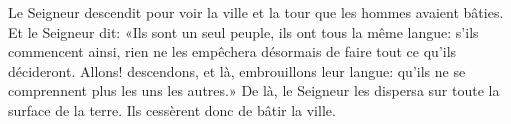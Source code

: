 Le Seigneur descendit pour voir la ville et la tour que les hommes avaient bâties.
Et le Seigneur dit: «Ils sont un seul peuple, ils ont tous la même langue:
	s’ils commencent ainsi, rien ne les empêchera désormais
	de faire tout ce qu’ils décideront.
Allons! descendons, et là, embrouillons leur langue:
	qu’ils ne se comprennent plus les uns les autres.»
De là, le Seigneur les dispersa sur toute la surface de la terre.
	Ils cessèrent donc de bâtir la ville.
